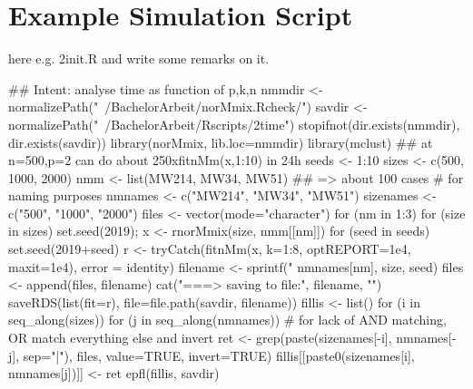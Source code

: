 \begin{Schunk}
\end{Schunk}

\clearpage
\section{Example Simulation Script}

here e.g. 2init.R and write some remarks on it.

\begin{Schunk}
\begin{Soutput}
## Intent: analyse time as function of p,k,n
nmmdir <- normalizePath("~/BachelorArbeit/norMmix.Rcheck/")
savdir <- normalizePath("~/BachelorArbeit/Rscripts/2time")
stopifnot(dir.exists(nmmdir), dir.exists(savdir))
library(norMmix, lib.loc=nmmdir)
library(mclust)
## at n=500,p=2 can do about 250xfitnMm(x,1:10) in 24h
seeds <- 1:10
sizes <- c(500, 1000, 2000)
nmm <- list(MW214, MW34, MW51)
## => about 100 cases
# for naming purposes
nmnames <- c("MW214", "MW34", "MW51")
sizenames <- c("500", "1000", "2000")
files <- vector(mode="character")
for (nm in 1:3) {
    for (size in sizes) {
    set.seed(2019); x <- rnorMmix(size, nmm[[nm]])
        for (seed in seeds) {
            set.seed(2019+seed)
            r <- tryCatch(fitnMm(x, k=1:8,
                                 optREPORT=1e4, maxit=1e4),
                          error = identity)
            filename <- sprintf("%s_size=%0.4d_seed=%0.2d.rds",
                                nmnames[nm], size, seed)
            files <- append(files, filename)
            cat("===> saving to file:", filename, "\n")
            saveRDS(list(fit=r), file=file.path(savdir, filename))
        }
    }
}
fillis <- list()
for (i in seq_along(sizes)) {
    for (j in seq_along(nmnames)) {
        # for lack of AND matching, OR match everything else and invert
        ret <- grep(paste(sizenames[-i], nmnames[-j], sep="|"), 
                    files, value=TRUE, invert=TRUE)
        fillis[[paste0(sizenames[i], nmnames[j])]] <- ret
    }
}
epfl(fillis, savdir)
\end{Soutput}
\end{Schunk}

